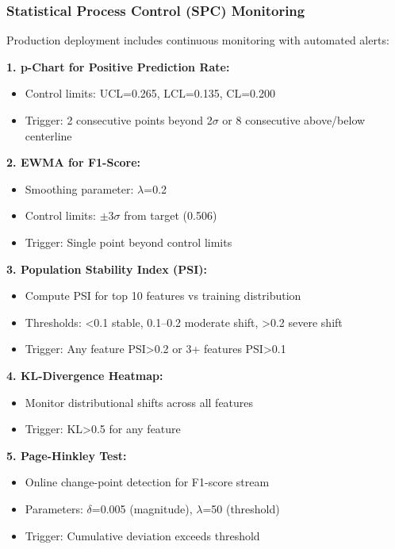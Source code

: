 \documentclass[conference]{IEEEtran}
\begin{document}
\subsubsection{Statistical Process Control (SPC) Monitoring}

Production deployment includes continuous monitoring with automated alerts:

\textbf{1. p-Chart for Positive Prediction Rate:}
\begin{itemize}
    \item Control limits: UCL=0.265, LCL=0.135, CL=0.200
    \item Trigger: 2 consecutive points beyond 2$\sigma$ or 8 consecutive above/below centerline
\end{itemize}

\textbf{2. EWMA for F1-Score:}
\begin{itemize}
    \item Smoothing parameter: $\lambda$=0.2
    \item Control limits: $\pm$3$\sigma$ from target (0.506)
    \item Trigger: Single point beyond control limits
\end{itemize}

\textbf{3. Population Stability Index (PSI):}
\begin{itemize}
    \item Compute PSI for top 10 features vs training distribution
    \item Thresholds: <0.1 stable, 0.1--0.2 moderate shift, >0.2 severe shift
    \item Trigger: Any feature PSI>0.2 or 3+ features PSI>0.1
\end{itemize}

\textbf{4. KL-Divergence Heatmap:}
\begin{itemize}
    \item Monitor distributional shifts across all features
    \item Trigger: KL>0.5 for any feature
\end{itemize}

\textbf{5. Page-Hinkley Test:}
\begin{itemize}
    \item Online change-point detection for F1-score stream
    \item Parameters: $\delta$=0.005 (magnitude), $\lambda$=50 (threshold)
    \item Trigger: Cumulative deviation exceeds threshold
\end{itemize}
\end{document}
